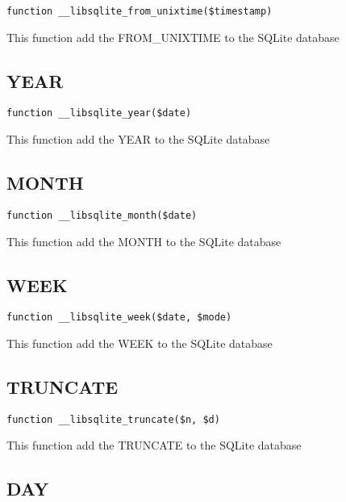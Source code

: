 \documentclass[a4paper]{book}
\begin{document}
\begin{lstlisting}
function __libsqlite_from_unixtime($timestamp)
\end{lstlisting}

This function add the FROM\_UNIXTIME to the SQLite database

\hypertarget{toc315}{}
\subsection{YEAR}

\begin{lstlisting}
function __libsqlite_year($date)
\end{lstlisting}

This function add the YEAR to the SQLite database

\hypertarget{toc316}{}
\subsection{MONTH}

\begin{lstlisting}
function __libsqlite_month($date)
\end{lstlisting}

This function add the MONTH to the SQLite database

\hypertarget{toc317}{}
\subsection{WEEK}

\begin{lstlisting}
function __libsqlite_week($date, $mode)
\end{lstlisting}

This function add the WEEK to the SQLite database

\hypertarget{toc318}{}
\subsection{TRUNCATE}

\begin{lstlisting}
function __libsqlite_truncate($n, $d)
\end{lstlisting}

This function add the TRUNCATE to the SQLite database

\hypertarget{toc319}{}
\subsection{DAY}
\end{document}
